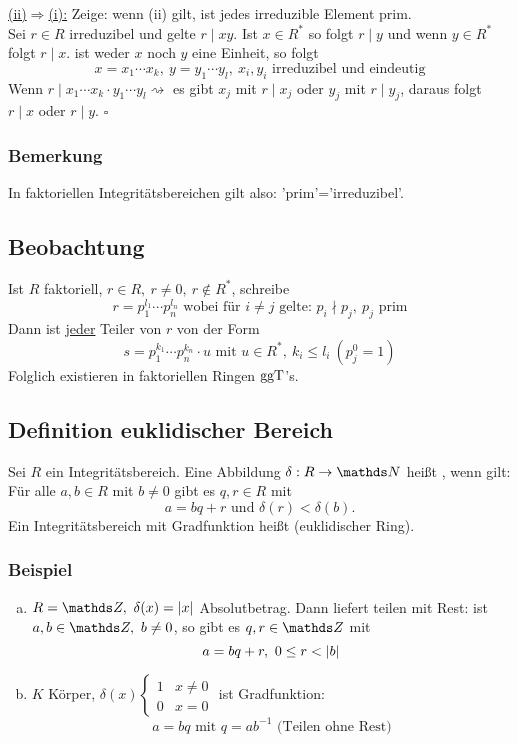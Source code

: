\uline{(ii)$\Rightarrow$(i):}
Zeige: wenn (ii) gilt, ist jedes irreduzible Element prim.\\
Sei $r\in R$ irreduzibel und gelte $r\mid xy$.
Ist $x\in R^*$ so folgt $r\mid y$ und wenn $y\in R^*$ folgt $r\mid x$.
ist weder $x$ noch $y$ eine Einheit, so folgt
\[
x=x_1\cdots x_k,~ y=y_1\cdots y_l,~x_i,y_i\text{ irreduzibel und eindeutig}
\]
Wenn $r\mid x_1\cdots x_k\cdot y_1\cdots y_l\rightsquigarrow$ es gibt $x_j$ mit $r\mid x_j$ oder $y_j$ mit $r\mid y_j$, daraus folgt $r\mid x$ oder $r\mid y$.
\hfill $\square$

\subsubsection*{Bemerkung}
In faktoriellen Integritätsbereichen gilt also: 'prim'='irreduzibel'.

\subsection{Beobachtung}
\label{sub:beobachtung}
Ist $R$ faktoriell, $r\in R,~r\neq 0,~r\notin R^*$, schreibe
\[
r=p_1^{l_1}\cdots p_n^{l_n} \text{ wobei für }i\neq j\text{ gelte: }p_i\nmid p_j,~p_j\text{ prim}
\]
Dann ist \uline{jeder} Teiler von $r$ von der Form
\[
s=p_1^{k_1}\cdots p_n^{k_n}\cdot u \text{ mit } u\in R^*,~k_i\le l_i~(p_j^0=1)
\]
Folglich existieren in faktoriellen Ringen $\operatorname{ggT}$'s.

\subsection{Definition euklidischer Bereich}
\label{sub:def_euklid_bereich}
Sei $R$ ein Integritätsbereich.
Eine Abbildung $\delta:R\to\N$ heißt , wenn gilt:
Für alle $a,b\in R$ mit $b\neq 0$ gibt es $q,r\in R$ mit
\[
a=bq+r \text{ und } \delta(r)<\delta(b).
\]
Ein Integritätsbereich mit Gradfunktion heißt  (euklidischer Ring).

\subsubsection*{Beispiel}
\begin{enumerate}[(a)]
	\item $R=\Z,~\delta(x)=\abs{x}$ Absolutbetrag.
	Dann liefert teilen mit Rest: ist $a,b\in\Z,~b\neq 0$, so gibt es $q,r\in\Z$ mit
	\[
	a=bq+r,~0\le r<\left\vert b\right\vert
	\]
	\item $K$ Körper, $\delta(x)\left\{\begin{array}{cl}1 & x\neq 0\\ 0 & x=0 \end{array}\right.$ ist Gradfunktion:
	\[
	a=bq \text{ mit } q=ab^{-1} \text{ (Teilen ohne Rest)}
	\]
\end{enumerate}

